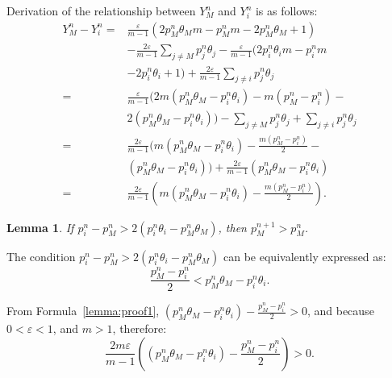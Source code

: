 \documentclass[10pt,journal,cspaper,compsoc,onecolumn]{IEEEtran}
\begin{document}
\begin{spacing}{1.3}
Derivation of the relationship between $Y_M^{n}$ and $Y_i^{n}$ is as follows:
 \begin{align}
    \label{eq:26}
    Y_M^n - Y_i^n = &\displaystyle\frac{\varepsilon}{m - 1}(2p_M^n\theta_Mm - p_M^nm - 2p_M^n\theta_M + 1)\nonumber \\
    & - \displaystyle\frac{2\varepsilon}{m - 1}\sum_{j \neq M}p_j^n\theta_j - \displaystyle\frac{\varepsilon}{m - 1}(2p_i^n\theta_im - p_i^nm\nonumber\\
    & - 2p_i^n\theta_i + 1) + \displaystyle\frac{2\varepsilon}{m - 1}\sum_{j \neq i}p_j^n\theta_j \nonumber\\
    =&\displaystyle\frac{\varepsilon}{m - 1}(2m(p_M^n\theta_M - p_i^n\theta_i) - m(p_M^n - p_i^n) -\nonumber\\
    & 2(p_M^n\theta_M - p_i^n\theta_i)) - \sum_{j \neq M}p_j^n\theta_j + \sum_{j \neq i}p_j^n\theta_j     \nonumber\\ 
    =& \displaystyle\frac{2\varepsilon}{m - 1}(m(p_M^n\theta_M - p_i^n\theta_i) - \displaystyle\frac{m(p_M^n - p_i^n)}{2} - \nonumber\\
    &(p_M^n\theta_M - p_i^n\theta_i)) + \displaystyle\frac{2\varepsilon}{m-1}(p_M^n\theta_M - p_i^n\theta_i)\nonumber\\
    =&\displaystyle\frac{2\varepsilon}{m - 1}(m(p_M^n\theta_M - p_i^n\theta_i) - \displaystyle\frac{m(p_M^n - p_i^n)}{2}).
\end{align}

\newtheorem{lem_appendix}{Lemma}
\label{Lemma_appdendix}
\begin{lem_appendix}
  If $p_i^{n} - p_M^{n} > 2(p_i^{n}\theta_i - p_M^{n}\theta_M)$, then $p_M^{n + 1} > p_M^{n}$.
\end{lem_appendix}
\begin{IEEEproof}
The condition $p_i^{n} - p_M^{n} > 2(p_i^{n}\theta_i - p_M^{n}\theta_M)$ can be equivalently expressed as:
\begin{equation}
  \label{lemma:proof1}
\displaystyle\frac{p_M^n - p_i^n}{2} < p_M^{n}\theta_M - p_i^{n}\theta_i.
\end{equation}

From Formula~\ref{lemma:proof1},  $(p_M^{n}\theta_M - p_i^{n}\theta_i) - \displaystyle\frac{p_M^n - p_i^n}{2} > 0$, and because $0 < \varepsilon < 1$, and $m > 1$,  therefore:
\begin{equation}
  \label{lemma:proof2}
\displaystyle\frac{2m\varepsilon}{m - 1}((p_M^{n}\theta_M - p_i^{n}\theta_i) - \displaystyle\frac{p_M^n - p_i^n}{2}) > 0.
\end{equation}


\end{IEEEproof}
\end{spacing}
\end{document}
